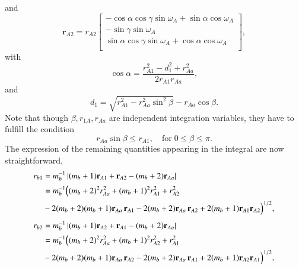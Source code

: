 and
\begin{equation}\label{eq170}
\mathbf{r}_{A2}=r_{A2}
\begin{bmatrix}
  -\cos\alpha\cos\gamma\sin\omega_A+\sin\alpha\cos\omega_A\\
 -\sin\gamma\sin\omega_A\\
\sin\alpha\cos\gamma\sin\omega_A+\cos\alpha\cos\omega_A\\
\end{bmatrix},
\end{equation}
with
\begin{equation}\label{eq171}
\cos\alpha=\frac{r_{A1}^2-d_1^2+r_{Aa}^2}{2r_{A1}r_{Aa}},
\end{equation}
and
\begin{equation}\label{eq172}
d_1=\sqrt{r_{A1}^2-r_{Aa}^2\sin^2\beta}-r_{Aa}\cos\beta.
\end{equation}
Note that though $\beta,r_{1A},r_{Aa}$ are independent integration variables, they have to fulfill the condition
\begin{equation}\label{eq173}
r_{Aa}\sin\beta\leq r_{A1}, \quad \text{for}\;0\leq\beta\leq\pi.
\end{equation}
The expression of the remaining quantities appearing in the integral are now straightforward,
\begin{equation}\label{eq174}
\begin{split}
r_{b1}&=m_b^{-1}\left|(m_b+1)\mathbf{r}_{A1}+\mathbf{r}_{A2}-(m_b+2)\mathbf{r}_{Aa}\right|\\
&=m_b^{-1}\Bigl((m_b+2)^2r_{Aa}^2+(m_b+1)^2r_{A1}^2+r_{A2}^2\\
&-2(m_b+2)(m_b+1)\mathbf{r}_{Aa}\,\mathbf{r}_{A1}-
2(m_b+2)\mathbf{r}_{Aa}\,\mathbf{r}_{A2}+2(m_b+1)\mathbf{r}_{A1}\mathbf{r}_{A2}\Bigr)^{1/2},
\end{split}
\end{equation}
\hspace{0.5cm}
\begin{equation}\label{eq175}
\begin{split}
r_{b2}&=m_b^{-1}\left|(m_b+1)\mathbf{r}_{A2}+\mathbf{r}_{A1}-(m_b+2)\mathbf{r}_{Aa}\right|\\
&=m_b^{-1}\Bigl((m_b+2)^2r_{Aa}^2+(m_b+1)^2r_{A2}^2+r_{A1}^2\\
&-2(m_b+2)(m_b+1)\mathbf{r}_{Aa}\,\mathbf{r}_{A2}-
2(m_b+2)\mathbf{r}_{Aa}\,\mathbf{r}_{A1}+2(m_b+1)\mathbf{r}_{A2}\mathbf{r}_{A1}\Bigr)^{1/2},
\end{split}
\end{equation}
\hspace{0.5cm}
